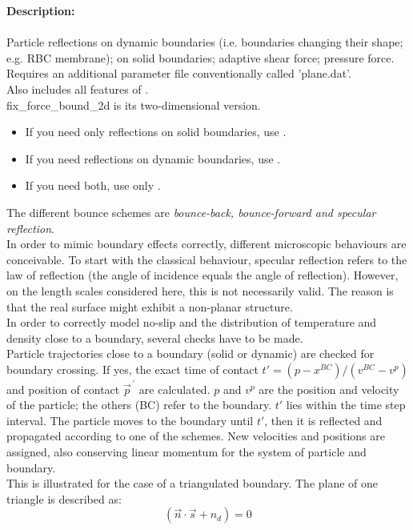 \documentclass[a4paper,10pt]{scrreprt}
\begin{document}
\textbf{Description:}\\ \\
Particle reflections on dynamic boundaries (i.e. boundaries changing their shape; e.g. RBC membrane); on solid boundaries; adaptive shear force; pressure force.\\Requires an additional parameter file conventionally called 'plane.dat'.\\Also includes all features of .\\fix\_force\_bound\_2d is its two-dimensional version.
\begin{itemize}
\item If you need only reflections on solid boundaries, use .
\item If you need reflections on dynamic boundaries, use .
\item If you need both, use only .
\end{itemize}
The different bounce schemes are \textit{bounce-back, bounce-forward and specular reflection}.\\In order to mimic boundary effects correctly, different microscopic behaviours are conceivable. To start with the classical behaviour, specular reflection refers to the law of reflection (the angle of incidence equals the angle of reflection). However, on the length scales considered here, this is not necessarily valid. The reason is that the real surface might exhibit a non-planar structure.\\In order to correctly model no-slip and the distribution of temperature and density close to a boundary, several checks have to be made.\\Particle trajectories close to a boundary (solid or dynamic) are checked for boundary crossing. If yes, the exact time of contact $t'=\left(p-x^{BC}\right)/\left(v^{BC}-v^p\right)$ and position of contact $\vec{p}^{\,'}$ are calculated. $p$ and $v^p$ are the position and velocity of the particle; the others (BC) refer to the boundary. $t'$ lies within the time step interval. The particle moves to the boundary until $t'$, then it is reflected and propagated according to one of the schemes. New velocities and positions are assigned, also conserving linear momentum for the system of particle and boundary.\\This is illustrated for the case of a triangulated boundary. The plane of one triangle is described as:
\begin{equation}
\left(\vec{n} \cdot \vec{s} + n_d \right) = 0
\end{equation}
\end{document}
